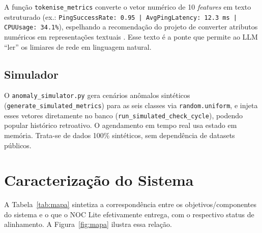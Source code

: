 \documentclass[12pt,a4paper]{article}
\begin{document}
A função \texttt{tokenise\_metrics} converte o vetor numérico de 10 \textit{
features} em texto estruturado (ex.: \texttt{PingSuccessRate: 0.95 |
AvgPingLatency: 12.3 ms | CPUUsage: 34.1\%}), espelhando a recomendação do
projeto de converter atributos numéricos em representações textuais
\cite{rA616}\cite{rA431}\cite{rA432}. Esse texto é a ponte que permite ao LLM ``ler'' os limiares
de rede em linguagem natural.

\subsection{Simulador}
\label{sec:sim}

O \texttt{anomaly\_simulator.py} gera cenários anômalos sintéticos
(\texttt{generate\_simulated\_metrics}) para as seis classes via
\texttt{random.uniform}, e injeta esses vetores diretamente no banco
(\texttt{run\_simulated\_check\_cycle}), podendo popular histórico retroativo.
O agendamento em tempo real usa estado em memória. Trata-se de dados 100\%
sintéticos, sem dependência de datasets públicos.

\section{Caracterização do Sistema}
\label{sec:mapeamento}

A Tabela~\ref{tab:mapa} sintetiza a correspondência entre os objetivos/componentes
do sistema e o que o NOC Lite efetivamente entrega, com
o respectivo status de alinhamento. A Figura~\ref{fig:mapa} ilustra essa
relação.
\end{document}
